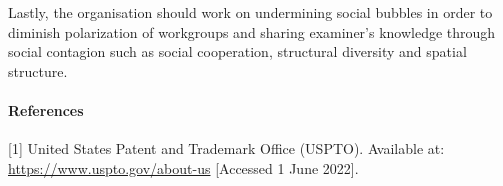 \documentclass[
]{article}
\begin{document}
Lastly, the organisation should work on undermining social bubbles in
order to diminish polarization of workgroups and sharing examiner's
knowledge through social contagion such as social cooperation,
structural diversity and spatial structure.

\hypertarget{references}{%
\paragraph{References}\label{references}}

{[}1{]} United States Patent and Trademark Office (USPTO). Available at:
\url{https://www.uspto.gov/about-us} {[}Accessed 1 June 2022{]}.
\end{document}
